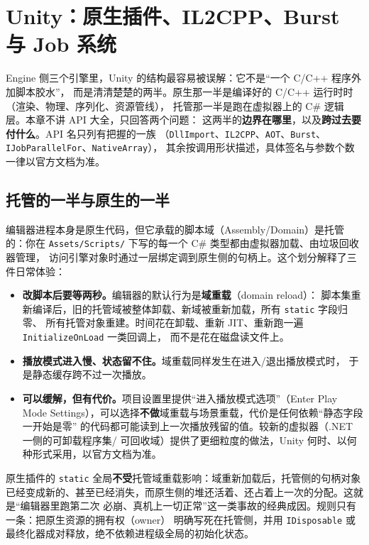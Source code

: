 \documentclass[12pt,a4paper,fontset=fandol]{ctexbook}
\newcommand{\Tp}[1]{\texttt{#1}}
\newcommand{\Bk}{\discretionary{}{}{}}
\newcommand{\Lang}[1]{\textsf{#1}}
\newcommand{\CL}{\Lang{C}}
\newcommand{\CPP}{\Lang{C++}}
\newcommand{\DomEngine}{\Lang{Engine}}
\begin{document}
\chapter{Unity：原生插件、IL2CPP、Burst 与 Job 系统}
\label{ch:ch11-unity}

\DomEngine{} 侧三个引擎里，Unity 的结构最容易被误解：它不是``一个 \CL/{\Bk}\CPP{} 程序外加脚本胶水''，
而是清清楚楚的两半。原生那一半是编译好的 \CL/{\Bk}\CPP{} 运行时时（渲染、物理、序列化、资源管线），
托管那一半是跑在虚拟器上的 \Lang{C\#} 逻辑层。本章不讲 API 大全，只回答两个问题：
这两半的\textbf{边界在哪里}，以及\textbf{跨过去要付什么}。API 名只列有把握的一族
（\Tp{DllImport}、\Tp{IL2CPP}、\Tp{AOT}、\Tp{Burst}、\Tp{IJobParallelFor}、\Tp{NativeArray}），
其余按调用形状描述，具体签名与参数个数一律以官方文档为准。

\section{托管的一半与原生的一半}
\label{sec:ch11-two-halves}

编辑器进程本身是原生代码，但它承载的脚本域（Assembly/Domain）是托管的：你在
\Tp{Assets/Scripts/} 下写的每一个 \Lang{C\#} 类型都由虚拟器加载、由垃圾回收器管理，
访问引擎对象时通过一层绑定调到原生侧的句柄上。这个划分解释了三件日常体验：

\begin{itemize}
  \item \textbf{改脚本后要等两秒。}编辑器的默认行为是\textbf{域重载}（domain reload）：
        脚本集重新编译后，旧的托管域被整体卸载、新域被重新加载，所有 \Tp{static} 字段归零、
        所有托管对象重建。时间花在卸载、重新 JIT、重新跑一遍 \Tp{InitializeOnLoad} 一类回调上，
        而不是花在磁盘读文件上。
  \item \textbf{播放模式进入慢、状态留不住。}域重载同样发生在进入/退出播放模式时，
        于是静态缓存跨不过一次播放。
  \item \textbf{可以缓解，但有代价。}项目设置里提供``进入播放模式选项''（Enter Play Mode
        Settings），可以选择\textbf{不做}域重载与场景重载，代价是任何依赖``静态字段一开始是零''
        的代码都可能读到上一次播放残留的值。较新的虚拟器（\Lang{.NET} 一侧的可卸载程序集/
        可回收域）提供了更细粒度的做法，Unity 何时、以何种形式采用，以官方文档为准。
\end{itemize}

\begin{note}[title={域重载是原生插件状态的隐形杀手}]
原生插件的 \Tp{static} 全局\textbf{不受}托管域重载影响：域重新加载后，托管侧的句柄对象
已经变成新的、甚至已经消失，而原生侧的堆还活着、还占着上一次的分配。这就是``编辑器里跑第二次
必崩、真机上一切正常''这一类事故的经典成因。规则只有一条：把原生资源的拥有权（owner）
明确写死在托管侧，并用 \Tp{IDisposable} 或最终化器成对释放，绝不依赖进程级全局的初始化状态。
\end{note}
\end{document}
